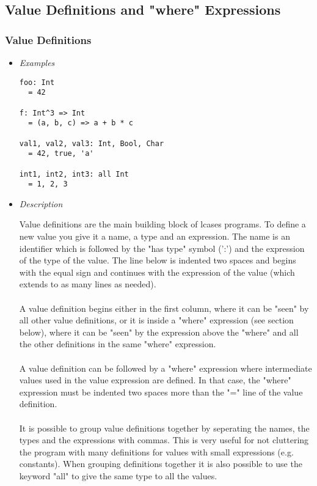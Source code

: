 \documentclass{article}
\begin{document}
\newpage

\subsection{Value Definitions and "where" Expressions}
\label{subsec:valdefswhere}

\subsubsection{Value Definitions}
\label{subsubsec:valdefs}

\begin{itemize}

\item \textit{Examples}

\begin{verbatim}
foo: Int
  = 42

f: Int^3 => Int
  = (a, b, c) => a + b * c

val1, val2, val3: Int, Bool, Char
  = 42, true, 'a'

int1, int2, int3: all Int
  = 1, 2, 3
\end{verbatim}

\item \textit{Description}

Value definitions are the main building block of lcases programs. To define a
new value you give it a name, a type and an expression. The name is an
identifier which is followed by the "has type" symbol (':') and the expression
of the type of the value. The line below is indented two spaces and begins with
the equal sign and continues with the expression of the value (which extends to
as many lines as needed).
\\\\
A value definition begins either in the first column, where it can be "seen" by
all other value definitions, or it is inside a "where" expression (see section
below), where it can be "seen" by the expression above the "where" and all the
other definitions in the same "where" expression.
\\\\
A value definition can be followed by a "where" expression where intermediate
values used in the value expression are defined. In that case, the "where"
expression must be indented two spaces more than the "=" line of the value
definition.
\\\\
It is possible to group value definitions together by seperating the names, the
types and the expressions with commas. This is very useful for not cluttering
the program with many definitions for values with small expressions (e.g.
constants).  When grouping definitions together it is also possible to use the
keyword "all" to give the same type to all the values.


\end{itemize}
\end{document}
